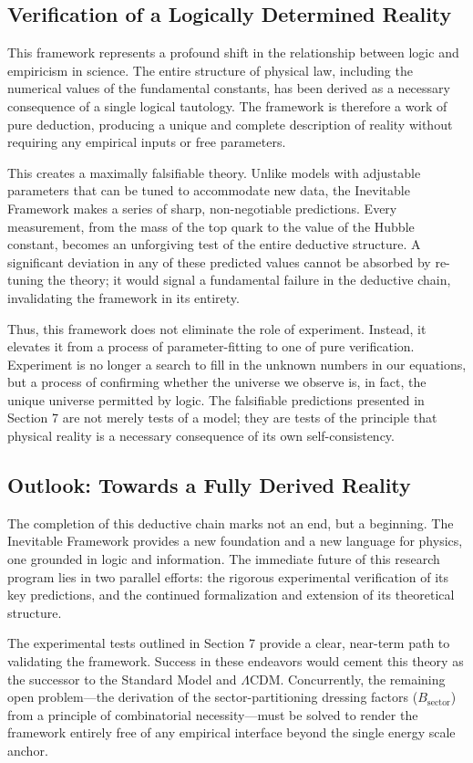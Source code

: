 \documentclass[11pt,a4paper]{article}
\begin{document}
\subsection{Verification of a Logically Determined Reality}
This framework represents a profound shift in the relationship between logic and empiricism in science. The entire structure of physical law, including the numerical values of the fundamental constants, has been derived as a necessary consequence of a single logical tautology. The framework is therefore a work of pure deduction, producing a unique and complete description of reality without requiring any empirical inputs or free parameters.

This creates a maximally falsifiable theory. Unlike models with adjustable parameters that can be tuned to accommodate new data, the Inevitable Framework makes a series of sharp, non-negotiable predictions. Every measurement, from the mass of the top quark to the value of the Hubble constant, becomes an unforgiving test of the entire deductive structure. A significant deviation in any of these predicted values cannot be absorbed by re-tuning the theory; it would signal a fundamental failure in the deductive chain, invalidating the framework in its entirety.

Thus, this framework does not eliminate the role of experiment. Instead, it elevates it from a process of parameter-fitting to one of pure verification. Experiment is no longer a search to fill in the unknown numbers in our equations, but a process of confirming whether the universe we observe is, in fact, the unique universe permitted by logic. The falsifiable predictions presented in Section 7 are not merely tests of a model; they are tests of the principle that physical reality is a necessary consequence of its own self-consistency.

\subsection{Outlook: Towards a Fully Derived Reality}
The completion of this deductive chain marks not an end, but a beginning. The Inevitable Framework provides a new foundation and a new language for physics, one grounded in logic and information. The immediate future of this research program lies in two parallel efforts: the rigorous experimental verification of its key predictions, and the continued formalization and extension of its theoretical structure.

The experimental tests outlined in Section 7 provide a clear, near-term path to validating the framework. Success in these endeavors would cement this theory as the successor to the Standard Model and \(\Lambda\)CDM. Concurrently, the remaining open problem—the derivation of the sector-partitioning dressing factors (\(B_{\text{sector}}\)) from a principle of combinatorial necessity—must be solved to render the framework entirely free of any empirical interface beyond the single energy scale anchor.
\end{document}
